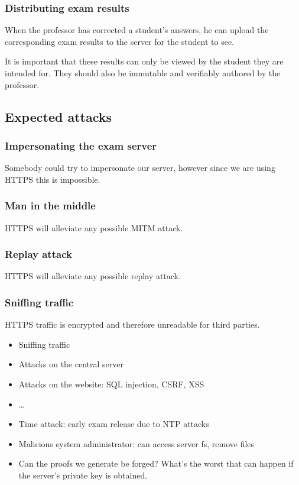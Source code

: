 \documentclass[12pt]{article}
\begin{document}
\subsubsection{Distributing exam results}
\label{subsubsec:req-func-results}


When the professor has corrected a student's answers, he can upload the
corresponding exam results to the server for the student to see.

It is important that these results can only be viewed by the student they are
intended for. They should also be immutable and verifiably authored by the
professor.

\subsection{Expected attacks}
\label{subsec:req-attacks}

\subsubsection{Impersonating the exam server}

Somebody could try to impersonate our server, however since we are using HTTPS
this is impossible.

\subsubsection{Man in the middle}

HTTPS will alleviate any possible MITM attack.

\subsubsection{Replay attack}

HTTPS will alleviate any possible replay attack.

\subsubsection{Sniffing traffic}

HTTPS traffic is encrypted and therefore unreadable for third parties.

\begin{itemize}
\item Sniffing traffic
\item Attacks on the central server
\item Attacks on the website: SQL injection, CSRF, XSS
\item \dots
\item Time attack: early exam release due to NTP attacks
\item Malicious system administrator: can access server fs, remove files
\item Can the proofs we generate be forged? What's the worst that can happen
if the server's private key is obtained.
\end{itemize}
\end{document}
